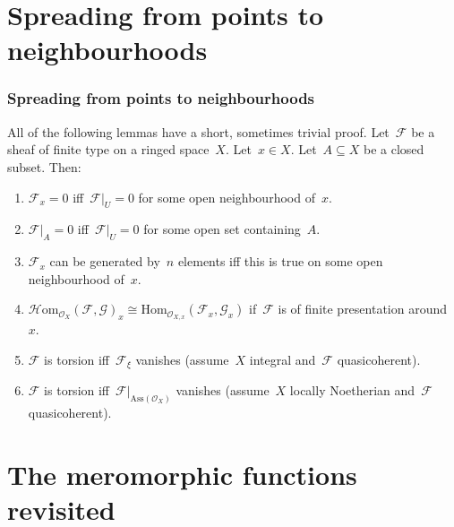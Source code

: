 \documentclass[12pt,utf8,notheorems,compress,t]{beamer}
\newcommand{\F}{\mathcal{F}}
\renewcommand{\G}{\mathcal{G}}
\renewcommand{\O}{\mathcal{O}}
\newcommand{\Hom}{\mathrm{Hom}}
\renewcommand{\_}{\mathpunct{.}}
\newcommand{\?}{\,{:}\,}
\newcounter{framenumberpreappendix}
\newcommand{\backupstart}{
  \setcounter{framenumberpreappendix}{\value{framenumber}}
}
\begin{document}
\backupstart

\appendix

\section{Spreading from points to neighbourhoods}

\begin{frame}\frametitle{Spreading from points to neighbourhoods}
  All of the following lemmas have a short, sometimes trivial proof.
  Let~$\F$ be a sheaf of finite type on a ringed space~$X$.
  Let~$x \in X$. Let~$A \subseteq X$ be a closed subset. Then:
  \small
  \begin{enumerate}
    \item $\F_x = 0$ iff~$\F|_U = 0$ for some open neighbourhood of~$x$.
    \item $\F|_A = 0$ iff~$\F|_U = 0$ for some open set containing~$A$.
    \item $\F_x$ can be generated by~$n$ elements iff this is true on some open
    neighbourhood of~$x$.
    \item $\mathcal{H}\mathrm{om}_{\O_X}(\F,\G)_x \cong
    \Hom_{\O_{X,x}}(\F_x,\G_x)$ if~$\F$ is of finite presentation around~$x$.
    \item $\F$ is torsion iff~$\F_\xi$ vanishes (assume~$X$ integral and~$\F$ quasicoherent).
    \item $\F$ is torsion iff~$\F|_{\mathrm{Ass}(\O_X)}$ vanishes (assume~$X$
    locally Noetherian and~$\F$ quasicoherent).
  \end{enumerate}
\end{frame}



\section{The meromorphic functions revisited}
\end{document}
